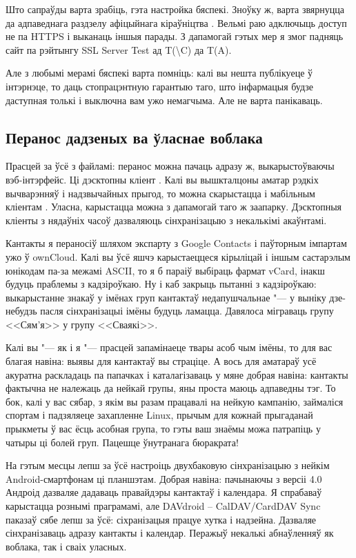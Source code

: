 \documentclass[10pt, a5paper]{article}
\begin{document}
Што сапраўды варта зрабіць, гэта настройка бяспекі. Зноўку ж, варта звярнуцца да адпаведнага раздзелу афіцыйнага кіраўніцтва \cite{zahar3}. Вельмі раю адключыць доступ не па HTTPS і выканаць іншыя парады. З дапамогай гэтых мер я змог падняць сайт па рэйтынгу SSL Server Test \cite{zahar5} ад T(\textbackslash{}C) да T(A).

Але з любымі мерамі бяспекі варта помніць: калі вы нешта публікуеце ў інтэрнэце, то даць стопрацэнтную гарантыю таго, што інфармацыя будзе даступная толькі і выключна вам ужо немагчыма. Але не варта панікаваць.

\subsection*{Перанос дадзеных ва ўласнае воблака}

Прасцей за ўсё з файламі: перанос можна пачаць адразу ж, выкарыстоўваючы вэб-інтэрфейс. Ці дэсктопны кліент \cite{zahar7}. Калі вы вышкталцоны аматар рэдкіх вычварэнняў і надзвычайных прыгод, то можна скарыстацца і мабільным кліентам \cite{zahar8}. Уласна, карыстацца можна з дапамогай таго ж заапарку. Дэсктопныя кліенты з нядаўніх часоў дазваляюць сінхранізацыю з некалькімі акаўнтамі.

Кантакты я пераносіў шляхом экспарту з Google Contacts і \linebreak паўторным імпартам ужо ў ownCloud. Калі вы ўсё яшчэ карыстаеццеся кірыліцай і іншым састарэлым юнікодам па-за межамі ASCII, то я б параіў выбіраць фармат vCard, інакш будуць праблемы з кадзіроўкаю. Ну і каб закрыць пытанні з кадзіроўкаю: выкарыстанне знакаў у імёнах груп кантактаў недапушчальнае "--- у выніку дзе-небудзь пасля сінхранізацыі імёны будуць ламацца. Давялоса міграваць групу <<Сям'я>> у групу <<Сваякі>>.

Калі вы "--- як і я "--- прасцей запамінаеце твары асоб чым імёны, то для вас благая навіна: выявы для кантактаў вы страціце. А вось для аматараў усё акуратна раскладаць па папачках і каталагізаваць у мяне добрая навіна: кантакты фактычна не належаць да нейкай групы, яны проста маюць адпаведны тэг. То бок, калі у вас сябар, з якім вы разам працавалі на нейкую кампанію, займаліся спортам і падзяляеце захапленне Linux, прычым для кожнай прыгаданай прыкметы ў вас ёсць асобная група, то гэты ваш знаёмы можа патрапіць у чатыры ці болей груп. Пацешце ўнутранага бюракрата!

На гэтым месцы лепш за ўсё настроіць двухбаковую сінхранізацыю з нейкім Android-смартфонам ці планшэтам. Добрая навіна: пачынаючы з версіі 4.0 Андроід дазваляе дадаваць правайдэры кантактаў і календара. Я спрабаваў карыстацца рознымі праграмамі, але DAVdroid – CalDAV/CardDAV Sync паказаў сябе лепш за ўсё: сіхранізацыя працуе хутка і надзейна. Дазваляе сінхранізаваць адразу кантакты і календар. Перажыў некалькі абнаўленняў як воблака, так і сваіх уласных.
\end{document}
